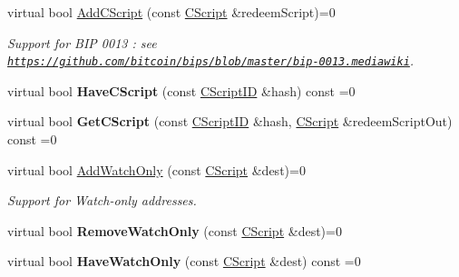 \begin{DoxyCompactItemize}
\item 
\mbox{\label{class_c_key_store_a2fb2e02e8cdc364607efd5ebb14b8064}} 
virtual bool \mbox{\hyperlink{class_c_key_store_a2fb2e02e8cdc364607efd5ebb14b8064}{Add\+C\+Script}} (const \mbox{\hyperlink{class_c_script}{C\+Script}} \&redeem\+Script)=0
\begin{DoxyCompactList}\small\item\em Support for B\+IP 0013 \+: see \href{https://github.com/bitcoin/bips/blob/master/bip-0013.mediawiki}{\tt https\+://github.\+com/bitcoin/bips/blob/master/bip-\/0013.\+mediawiki}. \end{DoxyCompactList}\item 
\mbox{\label{class_c_key_store_a51c9fc86b2c3fece10d86146231fa58d}} 
virtual bool {\bfseries Have\+C\+Script} (const \mbox{\hyperlink{class_c_script_i_d}{C\+Script\+ID}} \&hash) const =0
\item 
\mbox{\label{class_c_key_store_ae6bf4dbeb0705e199250e48aa5d34264}} 
virtual bool {\bfseries Get\+C\+Script} (const \mbox{\hyperlink{class_c_script_i_d}{C\+Script\+ID}} \&hash, \mbox{\hyperlink{class_c_script}{C\+Script}} \&redeem\+Script\+Out) const =0
\item 
\mbox{\label{class_c_key_store_a12cd4eaa01bd4f4231c0bf68425a44af}} 
virtual bool \mbox{\hyperlink{class_c_key_store_a12cd4eaa01bd4f4231c0bf68425a44af}{Add\+Watch\+Only}} (const \mbox{\hyperlink{class_c_script}{C\+Script}} \&dest)=0
\begin{DoxyCompactList}\small\item\em Support for Watch-\/only addresses. \end{DoxyCompactList}\item 
\mbox{\label{class_c_key_store_ad510747f28d129123a5200e4df8f7f61}} 
virtual bool {\bfseries Remove\+Watch\+Only} (const \mbox{\hyperlink{class_c_script}{C\+Script}} \&dest)=0
\item 
\mbox{\label{class_c_key_store_a15066cfd57feaffe0b9f4103c9311109}} 
virtual bool {\bfseries Have\+Watch\+Only} (const \mbox{\hyperlink{class_c_script}{C\+Script}} \&dest) const =0
\item 
\mbox{\label{class_c_key_store_a9169351f4acf62d299afb824174cbfa8}} 

\end{DoxyCompactItemize}
